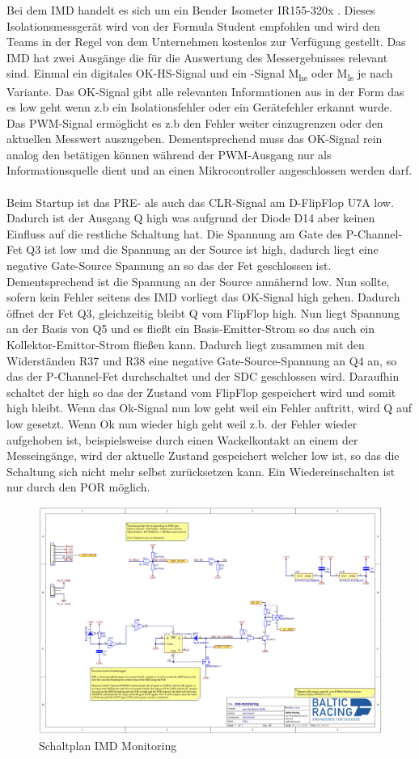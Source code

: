 Bei dem \ac{IMD} handelt es sich um ein Bender Isometer IR155-320x \cite{ISOMETER IR155-3203/IR155-3204}. Dieses Isolationsmessgerät wird von der Formula Student empfohlen und wird den Teams in der Regel von dem Unternehmen kostenlos zur Verfügung gestellt.
Das \ac{IMD} hat zwei Ausgänge die für die Auswertung des Messergebnisses relevant sind. Einmal ein digitales OK-HS-Signal und ein -Signal M\textsubscript{hs} oder M\textsubscript{ls} je nach Variante. Das OK-Signal gibt alle relevanten Informationen aus in der Form das es low geht wenn z.b ein Isolationsfehler oder ein Gerätefehler erkannt wurde. Das \ac{PWM}-Signal ermöglicht es z.b den Fehler weiter einzugrenzen oder den aktuellen Messwert auszugeben. Dementsprechend muss das OK-Signal rein analog den  betätigen können während der \ac{PWM}-Ausgang nur als Informationsquelle  dient und an einen Mikrocontroller angeschlossen werden darf. 
\\
\\
Beim Startup ist das PRE- als auch das CLR-Signal am D-FlipFlop U7A low. Dadurch ist der Ausgang Q high was aufgrund der Diode D14 aber keinen Einfluss auf die restliche Schaltung hat. Die Spannung am Gate des P-Channel-Fet Q3 ist low und die Spannung an der Source ist high, dadurch liegt eine negative Gate-Source Spannung an so das der Fet geschlossen ist. Dementsprechend ist die Spannung an der Source annähernd low. Nun sollte, sofern kein Fehler seitens des \ac{IMD} vorliegt das OK-Signal high gehen. Dadurch öffnet der Fet Q3, gleichzeitig bleibt Q vom FlipFlop high. Nun liegt Spannung an der Basis von Q5 und es fließt ein Basis-Emitter-Strom so das auch ein Kollektor-Emittor-Strom fließen kann. Dadurch liegt zusammen mit den Widerständen R37 und R38 eine negative Gate-Source-Spannung an Q4 an, so das der P-Channel-Fet durchschaltet und der \ac{SDC} geschlossen wird. Daraufhin schaltet der  high so das der Zustand vom FlipFlop gespeichert wird und somit high bleibt. Wenn das Ok-Signal nun low geht weil ein Fehler auftritt, wird Q auf low gesetzt. Wenn Ok nun wieder high geht weil z.b. der Fehler wieder aufgehoben ist, beispielsweise durch einen Wackelkontakt an einem der Messeingänge, wird der aktuelle Zustand gespeichert welcher low ist, so das die Schaltung sich nicht mehr selbst zurücksetzen kann. Ein Wiedereinschalten ist nur durch den \ac{POR} möglich.

\begin{figure}
	\centering
	\includegraphics[width=0.7\linewidth]{"bilder/IMD Monitoring schematic"}
	\caption{Schaltplan IMD Monitoring}
	\label{fig:imd-monitoring-schematic}
\end{figure}

